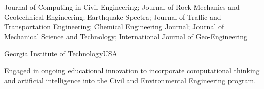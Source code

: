 
  {Journal of Computing in Civil Engineering; Journal of Rock Mechanics and Geotechnical Engineering; Earthquake Spectra; Journal of Traffic and Transportation Engineering; Chemical Engineering Journal; Journal of Mechanical Science and Technology; International Journal of Geo-Engineering}{}

  {Georgia Institute of Technology}{USA}
\begin{cvbullets}
  \item Engaged in ongoing educational innovation to incorporate computational thinking and artificial intelligence into the Civil and Environmental Engineering program.
\end{cvbullets}

